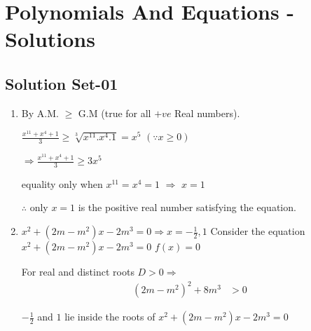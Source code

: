 
\chapter[]{Polynomials And Equations - Solutions}
\section[Solution Set-01]{Solution Set-01}
\begin{enumerate}
	\item By A.M. $\ge$ G.M  (true for all $+ve$ Real numbers).

	$\frac{x^{11} + x^4 + 1}{3} \ge \sqrt[3]{x^{11} . x^4 . 1} = x^5$  $(\because x \ge 0)$

	$\Rightarrow \frac{x^11 + x^4 + 1}{3} \ge 3x^5$

	equality only when $x^{11} = x^4 = 1$  $\Rightarrow$ $x=1$

	$\therefore $ only $x=1$ is the positive real number satisfying the equation.


	\item
	$x^2 + (2m - m^2)x - 2m^3 = 0 \Rightarrow x = -\frac{1}{2}, 1$
	Consider the equation $x^2 + (2m - m^2)x - 2m^3 = 0$    $f(x) = 0$

	For real and distinct roots $D > 0  \Rightarrow$
			 \begin{align*}
				(2m - m^2)^2+8m^3 &> 0  \tag{1}
			 \end{align*}

	$-\frac{1}{2}$ and $1$ lie inside the roots of $x^2 + (2m - m^2)x - 2m^3 = 0$

\begin{center}
\end{center}


\end{enumerate}
